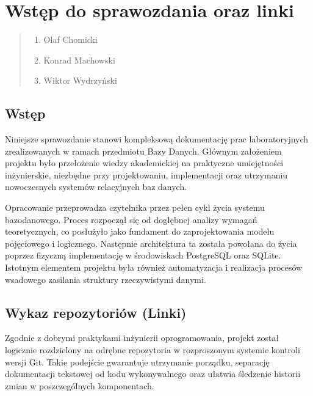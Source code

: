 \documentclass[a4paper,11pt,english,openany,oneside]{sphinxmanual}
\begin{document}
\chapter{Wstęp do sprawozdania oraz linki}
\label{\detokenize{rozdzial_1/index:wstep-do-sprawozdania-oraz-linki}}\label{\detokenize{rozdzial_1/index::doc}}\begin{quote}\begin{description}
\begin{enumerate}
%
\item {} 
\sphinxAtStartPar
Olaf Chomicki

\item {} 
\sphinxAtStartPar
Konrad Machowski

\item {} 
\sphinxAtStartPar
Wiktor Wydrzyński

\end{enumerate}

\end{description}\end{quote}


\section{Wstęp}
\label{\detokenize{rozdzial_1/index:wstep}}
\sphinxAtStartPar
Niniejsze sprawozdanie stanowi kompleksową dokumentację prac laboratoryjnych zrealizowanych w ramach przedmiotu Bazy Danych. Głównym założeniem projektu było przełożenie wiedzy akademickiej na praktyczne umiejętności inżynierskie, niezbędne przy projektowaniu, implementacji oraz utrzymaniu nowoczesnych systemów relacyjnych baz danych.

\sphinxAtStartPar
Opracowanie przeprowadza czytelnika przez pełen cykl życia systemu bazodanowego. Proces rozpoczął się od dogłębnej analizy wymagań teoretycznych, co posłużyło jako fundament do zaprojektowania modelu pojęciowego i logicznego. Następnie architektura ta została powołana do życia poprzez fizyczną implementację w środowiskach PostgreSQL oraz SQLite. Istotnym elementem projektu była również automatyzacja i realizacja procesów wsadowego zasilania struktury rzeczywistymi danymi.


\section{Wykaz repozytoriów (Linki)}
\label{\detokenize{rozdzial_1/index:wykaz-repozytoriow-linki}}
\sphinxAtStartPar
Zgodnie z dobrymi praktykami inżynierii oprogramowania, projekt został logicznie rozdzielony na odrębne repozytoria w rozproszonym systemie kontroli wersji Git. Takie podejście gwarantuje utrzymanie porządku, separację dokumentacji tekstowej od kodu wykonywalnego oraz ułatwia śledzenie historii zmian w poszczególnych komponentach.
\end{document}
